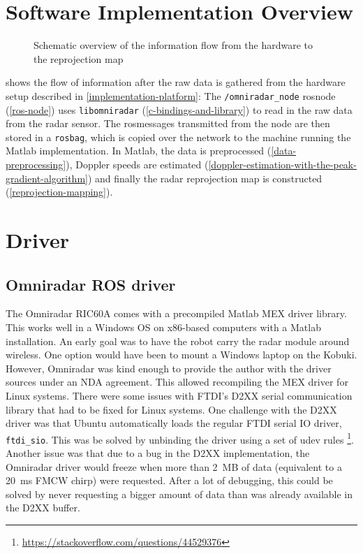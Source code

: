 \clearpage
\section{Software Implementation Overview}\label{overview}

\begin{figure}[htbp]
    \centering
    \def\svgwidth{\textwidth} \small
    
    \caption{Schematic overview of the information flow from the hardware to the reprojection map}
    \label{fig:overview}
\end{figure}

 shows the flow of information after the raw data is gathered from the hardware setup described in \cref{implementation-platform}: The \texttt{/omniradar\_node} rosnode (\cref{ros-node}) uses \texttt{libomniradar} (\cref{c-bindings-and-library}) to read in the raw data from the radar sensor. The rosmessages transmitted from the node are then stored in a \texttt{rosbag}, which is copied over the network to the machine running the Matlab implementation. In Matlab, the data is preprocessed (\cref{data-preprocessing}), Doppler speeds are estimated (\cref{doppler-estimation-with-the-peak-gradient-algorithm}) and finally the radar reprojection map is constructed (\cref{reprojection-mapping}).

\section{Driver}\label{driver}

\subsection{Omniradar ROS driver}\label{omniradar-ros-driver}

The Omniradar RIC60A comes with a precompiled Matlab MEX driver library.
This works well in a Windows OS on x86-based computers with a Matlab
installation. An early goal was to have the robot carry the radar module
around wireless. One option would have been to mount a Windows laptop on
the Kobuki. However, Omniradar was kind enough to provide the author
with the driver sources under an NDA agreement. This allowed recompiling
the MEX driver for Linux systems. There were some issues with FTDI's
D2XX serial communication library that had to be fixed for Linux
systems. One challenge with the D2XX driver was that Ubuntu
automatically loads the regular FTDI serial IO driver,
\texttt{ftdi\_sio}. This was be solved by unbinding the driver using a
set of udev rules \footnote{\url{https://stackoverflow.com/questions/44529376}}. Another
issue was that due to a bug in the D2XX implementation, the Omniradar
driver would freeze when more than \SI{2}{MB} of data (equivalent to a \SI{20}{ms}
FMCW chirp) were requested. After a lot of debugging, this could be
solved by never requesting a bigger amount of data than was already
available in the D2XX buffer.

